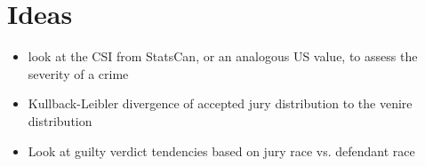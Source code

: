 \documentclass{article}
\begin{document}
\section{Ideas}
\begin{itemize}
\item look at the CSI from StatsCan, or an analogous US value, to assess the severity of a crime
\item Kullback-Leibler divergence of accepted jury distribution to the venire distribution
\item Look at guilty verdict tendencies based on jury race vs. defendant race
\end{itemize}


 
\end{document}
